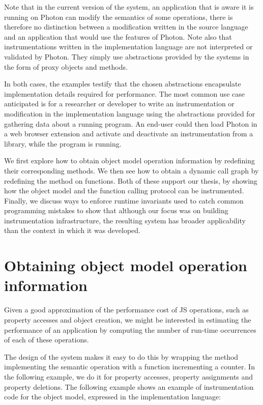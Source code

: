 Note that in the current version of the system, an application that is aware it
is running on Photon can modify the semantics of some operations, there is
therefore no distinction between a modification written in the source language
and an application that would use the features of Photon. Note also that
instrumentations written in the implementation language are not interpreted or
validated by Photon. They simply use abstractions provided by the systems in
the form of proxy objects and methods.

In both cases, the examples testify that the chosen abstractions encapsulate
implementation details required for performance. The most common use case
anticipated is for a researcher or developer to write an instrumentation or
modification in the implementation language using the abstractions provided for
gathering data about a running program. An end-user could then load Photon in a
web browser extension and activate and deactivate an instrumentation from a
library, while the program is running.

We first explore how to obtain object model operation information by redefining
their corresponding methods.  We then see how to obtain a dynamic call graph by
redefining the  method on functions. Both of these support our thesis,
by showing how the object model and the function calling protocol can be
instrumented. Finally, we discuss ways to enforce runtime invariants used to
catch common programming mistakes to show that although our focus was on
building instrumentation infrastructure, the resulting system has broader
applicability than the context in which it was developed.

\section{Obtaining object model operation information}
\label{sec:ObjectModelInstrumentation}

Given a good approximation of the performance cost of JS operations, such as
property accesses and object creation, we might be interested in estimating the
performance of an application by computing the number of run-time occurrences of
each of these operations.

The design of the system makes it easy to do this by wrapping the method
implementing the semantic operation with a function incrementing a counter.  In
the following example, we do it for property accesses, property assignments
and property deletions. The following example shows an example of
instrumentation code for the object model, expressed in the
implementation language:

